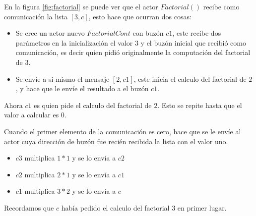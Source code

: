 En la figura \ref{fig:factorial} se puede ver que el actor $Factorial()$ recibe como comunicación la lista $[3,c]$, esto hace que ocurran dos cosas:

\begin{itemize}
\item Se cree un actor nuevo $FactorialCont$ con buzón $c1$, este recibe dos parámetros en la inicialización el valor $3$ y el buzón inicial que recibió como comunicación, es decir quien pidió originalmente la computación del factorial de $3$.

\item Se envíe a si mismo el mensaje $[2,c1]$, este inicia el calculo del factorial de $2$, y hace que le envíe el resultado a el buzón $c1$.
\end{itemize}

Ahora $c1$ es quien pide el calculo del factorial de $2$. Esto se repite hasta que el valor a calcular es $0$.

Cuando el primer elemento de la comunicación es cero, hace que se le envíe al actor cuya dirección de buzón fue recién recibida la lista con el valor uno. 

\begin{itemize}
\item $c3$ multiplica $1*1$ y se lo envía a $c2$
\item $c2$ multiplica $2*1$ y se lo envía a $c1$
\item $c1$ multiplica $3*2$ y se lo envía a $c$
\end{itemize}

Recordamos que $c$ había pedido el calculo del factorial $3$ en primer lugar.

